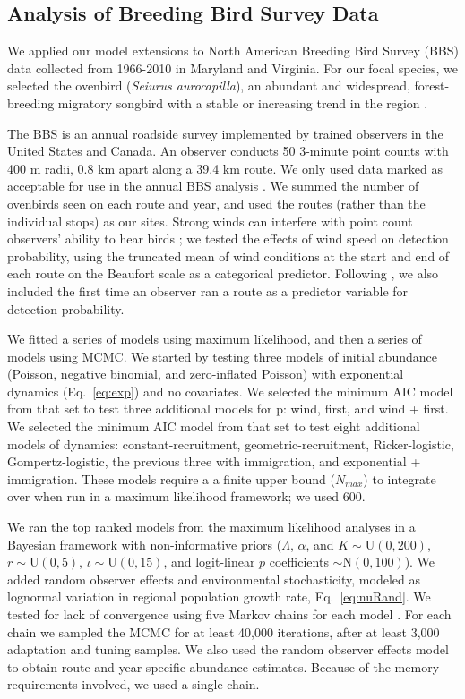 \documentclass[12pt,english]{article}
\begin{document}
\begin{spacing}{1.9}
\begin{flushleft}
\subsection*{Analysis of Breeding Bird Survey Data}

We applied our model extensions to North American Breeding Bird Survey
(BBS) data collected from 1966-2010 in 
Maryland and Virginia. For our focal species, we selected the
ovenbird (\textit{Seiurus aurocapilla}), an abundant and widespread,
forest- breeding migratory songbird with a stable or increasing trend
in the region \citep{porneluzi_etal:2011}. 

The BBS is an annual roadside survey implemented by trained
observers in the United States and Canada. An observer conducts 50
3-minute point counts with 400 m radii, 0.8 km apart 
along a
39.4 km route. We only used data marked as acceptable for use in the annual BBS
analysis \citep{sauer_etal:1994auk}.  We summed the number of ovenbirds
seen on each route and year, and used the routes (rather
than the individual stops) as our sites.
Strong winds can interfere with point count observers' ability
to hear birds \citep{simons_etal:2007}; we tested the effects of wind
speed on detection probability, using the truncated mean of wind conditions at the start and end of
each route on the Beaufort scale as a categorical predictor. 
Following \citet{link_sauer:2002},
we also included the first time an observer ran a route as a predictor variable for detection
probability.
 
We fitted a series of models using maximum likelihood, 
and then a series of models using MCMC. We started by testing
three models of initial abundance (Poisson, negative binomial, and
zero-inflated Poisson) with exponential dynamics
(Eq.~\ref{eq:exp}) and no covariates.  We selected the minimum AIC model from that set to test three additional
models for p: wind, first, and wind + first. We selected the minimum
AIC model from that set to test eight additional models of dynamics:
constant-recruitment, geometric-recruitment, Ricker-logistic, Gompertz-logistic, 
the previous three with immigration, and exponential + immigration.
These models require a a finite upper bound ($N_{max}$) to integrate
over when run in a maximum likelihood
framework; we used 600. 

We ran the top ranked models from the maximum likelihood
analyses in a Bayesian framework with non-informative priors ($\Lambda$,
$\alpha$, and $K  \sim \mathrm{U}(0, 200)$, $r  \sim \mathrm{U}(0, 5)$,
$\iota  \sim \mathrm{U}(0, 15)$, and logit-linear $p$ coefficients $\sim \mathrm{N}(0, 100)$).  
We added random observer 
effects and environmental stochasticity, modeled as lognormal
variation in regional population growth rate, Eq.~\ref{eq:nuRand}.
We tested for lack of convergence using
five Markov chains for each model \citep{gelman_rubin:1992}.
For each chain we sampled the MCMC for at least 40,000 iterations, after at
least 3,000 adaptation and tuning samples.  
We also used the random observer effects model to obtain route and 
year specific abundance estimates.  Because of the memory requirements involved,
we used a single chain.  


\end{flushleft}
\end{spacing}
\end{document}
